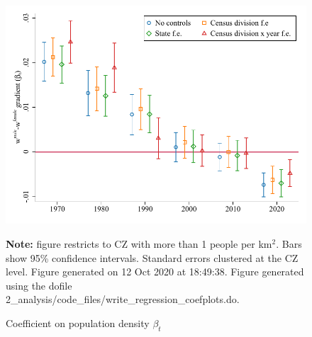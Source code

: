 \begin{figure}[!h]
\centering
\caption{Coefficient on population density $ \beta_t $}
\includegraphics[width=.6\textwidth]{../2_analysis/output/figures/baseline_gradients_l_czone_density_full_time}
\par \begin{minipage}[h]{\textwidth}{\tiny\textbf{Note:} figure restricts to CZ with more than 1 people per km$^2$. Bars show 95\% confidence intervals. Standard errors clustered at the CZ level. Figure generated on 12 Oct 2020 at 18:49:38. Figure generated using the dofile 2\_analysis/code\_files/write\_regression\_coefplots.do.}\end{minipage}
\end{figure}
